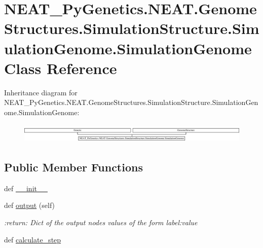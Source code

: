 \hypertarget{classNEAT__PyGenetics_1_1NEAT_1_1GenomeStructures_1_1SimulationStructure_1_1SimulationGenome_1_1SimulationGenome}{}\section{N\+E\+A\+T\+\_\+\+Py\+Genetics.\+N\+E\+A\+T.\+Genome\+Structures.\+Simulation\+Structure.\+Simulation\+Genome.\+Simulation\+Genome Class Reference}
\label{classNEAT__PyGenetics_1_1NEAT_1_1GenomeStructures_1_1SimulationStructure_1_1SimulationGenome_1_1SimulationGenome}
Inheritance diagram for N\+E\+A\+T\+\_\+\+Py\+Genetics.\+N\+E\+A\+T.\+Genome\+Structures.\+Simulation\+Structure.\+Simulation\+Genome.\+Simulation\+Genome\+:\begin{figure}[H]
\begin{center}
\leavevmode
\includegraphics[height=0.939597cm]{classNEAT__PyGenetics_1_1NEAT_1_1GenomeStructures_1_1SimulationStructure_1_1SimulationGenome_1_1SimulationGenome}
\end{center}
\end{figure}
\subsection*{Public Member Functions}
\begin{DoxyCompactItemize}
\item 
def \hyperlink{classNEAT__PyGenetics_1_1NEAT_1_1GenomeStructures_1_1SimulationStructure_1_1SimulationGenome_1_1SimulationGenome_a9e3d21a710e6b90ca8d6332fbdc8faa2}{\+\_\+\+\_\+init\+\_\+\+\_\+}
\item 
def \hyperlink{classNEAT__PyGenetics_1_1NEAT_1_1GenomeStructures_1_1SimulationStructure_1_1SimulationGenome_1_1SimulationGenome_af8bbfbec0e15a55d7a889ba9859f034a}{output} (self)
\begin{DoxyCompactList}\small\item\em \+:return\+: Dict of the output nodes\textquotesingle{} values of the form label\+:value \end{DoxyCompactList}\item 
def \hyperlink{classNEAT__PyGenetics_1_1NEAT_1_1GenomeStructures_1_1SimulationStructure_1_1SimulationGenome_1_1SimulationGenome_ae35fc2d42a8f79cf1cf7cf65b40910b6}{calculate\+\_\+step}
\end{DoxyCompactItemize}

